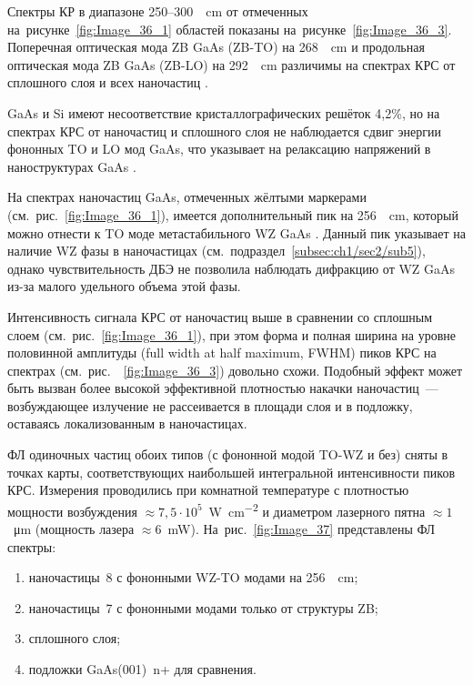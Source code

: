Спектры КР в диапазоне 250--300~\si{\per\centi\metre} от отмеченных на~рисунке~\cref{fig:Image_36_1} областей показаны на~рисунке~\cref{fig:Image_36_3}. Поперечная оптическая мода ZB GaAs (ZB-TO) на 268~\si{\per\centi\metre} и продольная оптическая мода ZB GaAs (ZB-LO) на 292~\si{\per\centi\metre} различимы на спектрах КРС от сплошного слоя и всех наночастиц \cite{Signorello2014}.

GaAs и Si имеют несоответствие кристаллографических решёток 4,2\%, но на спектрах КРС от наночастиц и сплошного слоя не наблюдается сдвиг энергии фононных TO и LO мод GaAs, что указывает на релаксацию напряжений в наноструктурах GaAs \cite{Alekseev2017}.

На спектрах наночастиц GaAs, отмеченных жёлтыми маркерами (см.~рис.~\cref{fig:Image_36_1}), имеется дополнительный пик на 256~\si{\per\centi\metre}, который можно отнести к TO моде метастабильного WZ GaAs \cite{Fu2004}. Данный пик указывает на наличие WZ фазы в наночастицах (см.~подраздел~\cref{subsec:ch1/sec2/sub5}), однако чувствительность ДБЭ не позволила наблюдать дифракцию от WZ GaAs из-за малого удельного объема этой фазы.

Интенсивность сигнала КРС от наночастиц выше в сравнении со сплошным слоем (см.~рис.~\cref{fig:Image_36_1}), при этом форма и полная ширина на уровне половинной амплитуды (full width at half maximum, FWHM) пиков КРС на спектрах (см.~рис.~~\cref{fig:Image_36_3}) довольно схожи. Подобный эффект может быть вызван более высокой эффективной плотностью накачки наночастиц~--- возбуждающее излучение не рассеивается в площади слоя и в подложку, оставаясь локализованным в наночастицах.

ФЛ одиночных частиц обоих типов (с фононной модой TO-WZ и без) сняты в точках карты, соответствующих наибольшей интегральной интенсивности пиков КРС. Измерения проводились при комнатной температуре с плотностью мощности возбуждения \(\approx 7,5 \cdot 10^5\)~\si{\watt\per\centi\metre\squared} и диаметром лазерного пятна \(\approx 1\)~\si{\micro\metre} (мощность лазера \(\approx 6\)~\si{\milli\watt}). На~рис.~\cref{fig:Image_37} представлены ФЛ спектры:
\begin{enumerate}[beginpenalty=10000]
	\item наночастицы~8 с фононными WZ-TO модами на 256~\si{\per\centi\metre};
	\item наночастицы~7 с фононными модами только от структуры ZB;
	\item сплошного слоя;
	\item подложки GaAs(001)~n+ для сравнения.
\end{enumerate}

